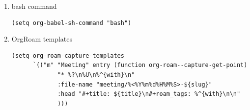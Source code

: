 \documentclass[11pt]{article}
\begin{document}
\begin{enumerate}
\item bash command
\label{sec:org826d2a2}
\begin{verbatim}
(setq org-babel-sh-command "bash")
\end{verbatim}

\item OrgRoam templates
\label{sec:orgd7752ba}

\begin{verbatim}
(setq org-roam-capture-templates
      `(("m" "Meeting" entry (function org-roam--capture-get-point)
             "* %?\n%U\n%^{with}\n"
             :file-name "meeting/%<%Y%m%d%H%M%S>-${slug}"
             :head "#+title: ${title}\n#+roam_tags: %^{with}\n\n"
             )))

\end{verbatim}
\end{enumerate}
\end{document}
